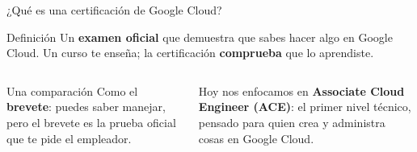 \documentclass[aspectratio=169,10pt,c]{beamer}
\begin{document}
\begin{frame}{¿Qué es una certificación de Google Cloud?}
\begin{block}{Definición}
\small Un \textbf{examen oficial} que demuestra que sabes hacer algo en Google Cloud. Un curso te enseña; la certificación \textbf{comprueba} que lo aprendiste.
\end{block}
\begin{columns}[c,onlytextwidth]
\centering
{}
\begin{exampleblock}{Una comparación}
\small Como el \textbf{brevete}: puedes saber manejar, pero el brevete es la prueba oficial que te pide el empleador.
\end{exampleblock}
\begin{alertblock}{Hoy nos enfocamos en}
\small \textbf{Associate Cloud Engineer (ACE)}: el primer nivel técnico, pensado para quien crea y administra cosas en Google Cloud.
\end{alertblock}
\end{columns}
\end{frame}
\end{document}
